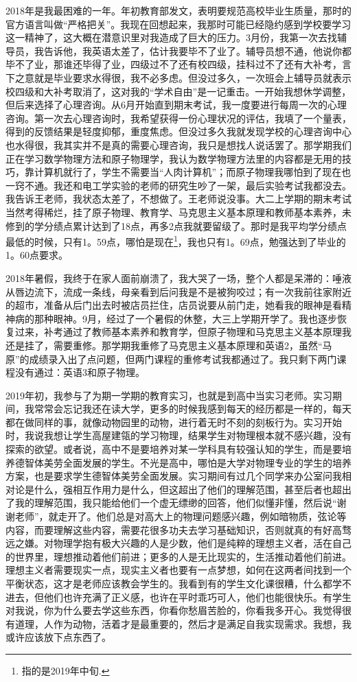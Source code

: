 	    2018年是我最困难的一年。年初教育部发文，表明要规范高校毕业生质量，那时的官方语言叫做“严格把关”。我现在回想起来，我那时可能已经隐约感到学校要学习这一精神了，这大概在潜意识里对我造成了巨大的压力。3月份，我第一次去找辅导员，我告诉他，我英语太差了，估计我要毕不了业了。辅导员想不通，他说你都毕不了业，那谁还毕得了业，四级过不了还有校四级，挂科过不了还有大补考，言下之意就是毕业要求水得很，我不必多虑。但没过多久，一次班会上辅导员就表示校四级和大补考取消了，这对我的“学术自由”是一记重击。一开始我想休学调整，但后来选择了心理咨询。从6月开始直到期末考试，我一度要进行每周一次的心理咨询。第一次去心理咨询时，我希望获得一份心理状况的评估，我填了一个量表，得到的反馈结果是轻度抑郁，重度焦虑。但没过多久我就发现学校的心理咨询中心也水得很，我其实并不是真的需要心理咨询，我只是想找人说话罢了。那学期我们正在学习数学物理方法和原子物理学，我认为数学物理方法里的内容都是无用的技巧，靠计算机就行了，学生不需要当“人肉计算机”；而原子物理我哪怕到了现在也一窍不通。我还和电工学实验的老师的研究生吵了一架，最后实验考试我都没去。我告诉王老师，我状态太差了，不想做了。王老师说没事。大二上学期的期末考试当然考得稀烂，挂了原子物理、教育学、马克思主义基本原理和教师基本素养，未修到的学分绩点累计达到了18点，再多2点我就要留级了。那时是我平均学分绩点最低的时候，只有1。59点，哪怕是现在\footnote{指的是2019年中旬.}，我也只有1。69点，勉强达到了毕业的1。60点要求。

	    2018年暑假，我终于在家人面前崩溃了，我大哭了一场，整个人都是呆滞的：唾液从唇边流下，流成一条线，母亲看到后问我是不是被狗咬过；有一次我前往家附近的超市，准备从后门出去时被店员拦住，店员说要从前门走，她看我的眼神是看精神病的那种眼神。9月，经过了一个暑假的休整，大三上学期开学了。我也逐步恢复过来，补考通过了教师基本素养和教育学，但原子物理和马克思主义基本原理我还是挂了，需要重修。那学期我重修了马克思主义基本原理和英语2，虽然“马原”的成绩录入出了点问题，但两门课程的重修考试我都通过了。我只剩下两门课程没有通过：英语3和原子物理。

	    2019年初，我参与了为期一学期的教育实习，也就是到高中当实习老师。实习期间，我常常会忘记我还在读大学，更多的时候我感到每天的经历都是一样的，每天都在做同样的事，就像动物园里的动物，进行着无时不刻的刻板行为。实习开始时，我说我想让学生高屋建瓴的学习物理，结果学生对物理根本就不感兴趣，没有探索的欲望。或者说，高中不是要培养对某一学科具有较强认知的学生，而是要培养德智体美劳全面发展的学生。不光是高中，哪怕是大学对物理专业的学生的培养方案，也是要求学生德智体美劳全面发展。实习期间有过几个同学来办公室问我相对论是什么，强相互作用力是什么，但这超出了他们的理解范围，甚至后者也超出了我的理解范围，我只能给他们一个虚无缥缈的回答，他们似懂非懂，然后说“谢谢老师”，就走开了。他们总是对高大上的物理问题感兴趣，例如暗物质，弦论等内容，而要理解这些内容，需要花很多功夫去学习基础知识，否则就真的有好高骛远之嫌。对物理学抱有极大兴趣的人是少数，他们是纯粹的理想主义者，活在自己的世界里，理想推动着他们前进；更多的人是无比现实的，生活推动着他们前进。理想主义者需要现实一点，现实主义者也要有一点梦想，如何在这两者间找到一个平衡状态，这才是老师应该教会学生的。我看到有的学生文化课很糟，什么都学不进去，但他们也许充满了正义感，也许在平时乖巧可人，他们也能很快乐。有学生对我说，你为什么要去学这些东西，你看你愁眉苦脸的，你看我多开心。我觉得很有道理，人作为动物，活着才是最重要的，然后才是满足自我实现需求。我想，我或许应该放下点东西了。

